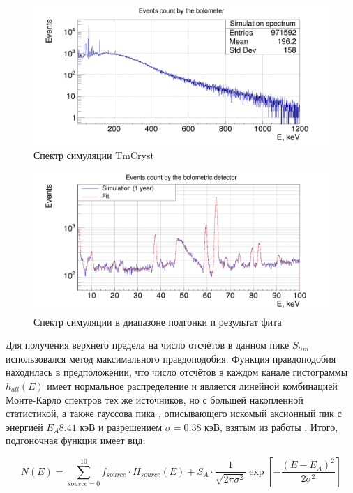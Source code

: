 \documentclass[a4paper,article,14pt]{extarticle}
\begin{document}
\begin{figure}[h!]
    \centering
    \includegraphics[width = \textwidth]{images/SpectrumTmCryst.png}
    \caption{Спектр симуляции TmCryst}
    \label{hist_all}
\end{figure}

\begin{figure}[h!]
    \centering
    \includegraphics[width = \textwidth]{images/axion_fit.png}
    \caption{Спектр симуляции в диапазоне подгонки и результат фита}
    \label{AxionFit}
\end{figure}
Для получения верхнего предела на число отсчётов в данном пике $S_{lim}$ использовался метод максимального правдоподобия. Функция правдоподобия находилась в предположении, что число отсчётов в каждом канале гистограммы $h_{all} \left( E \right)$ имеет нормальное распределение и является линейной комбинацией Монте-Карло спектров тех же источников, но с большей накопленной статистикой, а также гауссова пика , описывающего искомый аксионный пик с энергией $E_A 8.41 \text{ кэВ}$ и разрешением $\sigma = 0.38 \text{ кэВ}$, взятым из работы \cite{test_bolometric_tm}. Итого, подгоночная функция имеет вид:

\begin{equation}
    N\left( E \right) = \sum\limits_{source = 0}^{10} {{f_{source}} \cdot {H_{source}}\left( E \right)}  + {S_A} \cdot \frac{1}{{\sqrt {2\pi {\sigma ^2}} }}\exp \left[ { - \frac{{{{\left( {E - {E_A}} \right)}^2}}}{{2{\sigma ^2}}}} \right]
\end{equation}
\end{document}
